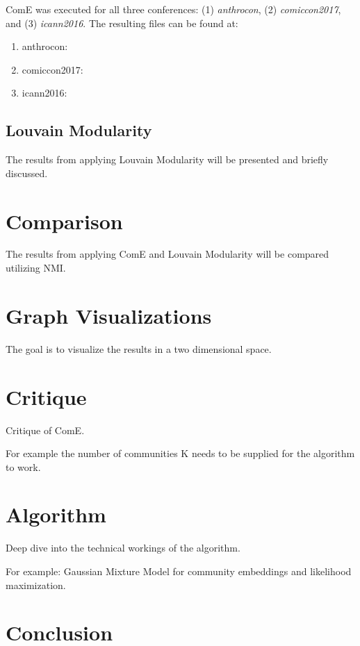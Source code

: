 \documentclass[sigconf]{acmart}
\begin{document}
ComE was executed for all three conferences: (1) \textit{anthrocon}, (2) \textit{comiccon2017}, and (3) \textit{icann2016}. The resulting files can be found at:
\begin{enumerate}
	\item anthrocon: \textit{}
	\item comiccon2017: \textit{}
	\item icann2016: \textit{}
\end{enumerate}


\subsection{Louvain Modularity}

The results from applying Louvain Modularity will be presented and briefly discussed.

\section{Comparison}

The results from applying ComE and Louvain Modularity will be compared utilizing NMI.

\section{Graph Visualizations}

The goal is to visualize the results in a two dimensional space.

\section{Critique}

Critique of ComE.

For example the number of communities K needs to be supplied for the algorithm to work.

\section{Algorithm}

Deep dive into the technical workings of the algorithm.

For example: Gaussian Mixture Model for community embeddings and likelihood maximization.

\section{Conclusion}
\end{document}
